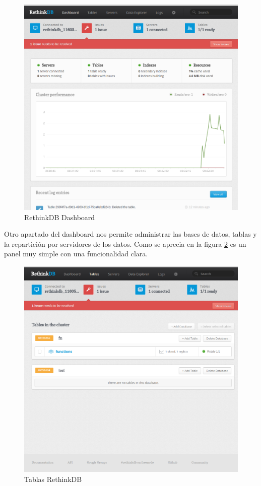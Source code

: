\begin{figure}[H]
    \centering
    \includegraphics[width=\textwidth]{../images/rethinkdb/dashboard.png}
    \caption{RethinkDB Dashboard}
    \label{fig:rethinkdb-dashboard}
\end{figure}

Otro apartado del dashboard nos permite administrar las bases de datos, tablas y la repartición por servidores de los datos. Como se aprecia en la figura \ref{fig:rethinkdb-tables} es un panel muy simple con una funcionalidad clara.

\begin{figure}[H]
    \centering
    \includegraphics[width=\textwidth]{../images/rethinkdb/tables.png}
    \caption{Tablas RethinkDB}
    \label{fig:rethinkdb-tables}
\end{figure}

